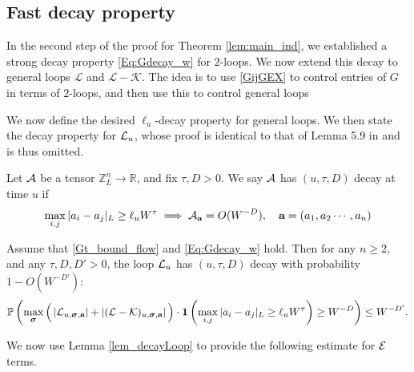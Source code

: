   
\subsection{Fast decay property}
In the second step of the proof for Theorem \ref{lem:main_ind}, we established a strong decay property \eqref{Eq:Gdecay_w} for $2$-loops. We now extend this decay to general loops $\mathcal{L}$ and $\mathcal{L} - \mathcal{K}$. The idea is to use \eqref{GijGEX} to control entries of $G$ in terms of $2$-loops, and then use this to control general loops

We now define the desired $\ell_{u}$-decay property for general loops. We then state the decay property for ${\cal L}_{u}$, whose proof is identical to that of Lemma 5.9 in \cite{YY_25} and is thus omitted.

\begin{definition}\label{Def_decay}
   Let  $\cal A$ be a tensor $\mathbb Z_L^n\to \mathbb R$, and fix $\tau,D>0$. We say $\cal A$ has $(u, \tau, D)$ decay at  time $u$ if   
\begin{equation}\label{deccA}
    \max_{i,j} |a_i-a_j|_{L}\ge \ell_u W^{\tau} \implies  {\cal A}_{\textbf{a}}=O(W^{-D}),\quad \textbf{a}=(a_1,a_2\cdots, a_n) 
\end{equation}
\end{definition}
\begin{lemma}\label{lem_decayLoop}  
Assume that \eqref{Gt_bound_flow} and \eqref{Eq:Gdecay_w} hold. Then  for 
any $n\ge 2$, and any $\tau,D,D'>0$, the loop  ${\cal L}_u$ has $(u, \tau, D)$ decay  with probability $1-O(W^{-D'})$: 
\begin{align}\label{res_decayLK}
\mathbb P\left( \max_{\boldsymbol{\sigma}}  \Big(\left|{\cal L}_{u,\boldsymbol{\sigma},\textbf{a}}\right|+\left|({\cal L-K})_{u,\boldsymbol{\sigma},\textbf{a}}\right|\Big)\cdot{\bf 1}\left(\max_{  i, j } |a_i-a_j|_{L}\ge \ell_u W^{\tau}\right) \ge W^{-D}\right)\le W^{-D'}. 
\end{align}
 \end{lemma}

We now use Lemma \ref{lem_decayLoop} to provide the following estimate for ${\cal E}$ terms.

